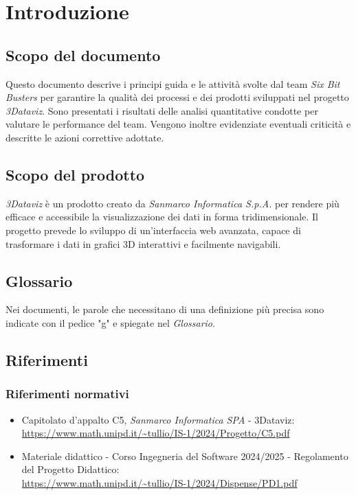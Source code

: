     \section{Introduzione}
    \subsection{Scopo del documento}
        Questo documento descrive i principi guida e le attività svolte dal team \textit{Six Bit Busters} per garantire la qualità dei processi e dei prodotti sviluppati nel progetto \textit{3Dataviz}.  
        Sono presentati i risultati delle analisi quantitative condotte per valutare le performance del team. Vengono inoltre evidenziate eventuali criticità e descritte le azioni correttive adottate.

    \subsection{Scopo del prodotto}
        \textit{3Dataviz} è un prodotto creato da \textit{Sanmarco Informatica S.p.A.} per rendere più efficace e accessibile la visualizzazione dei dati in forma tridimensionale.  
        Il progetto prevede lo sviluppo di un’interfaccia web avanzata, capace di trasformare i dati in grafici 3D interattivi e facilmente navigabili.

    \subsection{Glossario}
        Nei documenti, le parole che necessitano di una definizione più precisa sono indicate con il pedice "g" e spiegate nel \textit{Glossario}.

    \subsection{Riferimenti}
        \subsubsection{Riferimenti normativi}
        \begin{itemize}
            \item Capitolato d'appalto C5, \textit{Sanmarco Informatica SPA} - 3Dataviz:  \\
            \url{https://www.math.unipd.it/~tullio/IS-1/2024/Progetto/C5.pdf}
            \item Materiale didattico - Corso Ingegneria del Software 2024/2025 - Regolamento del Progetto Didattico: \\ 
            \url{https://www.math.unipd.it/~tullio/IS-1/2024/Dispense/PD1.pdf}
        \end{itemize}

